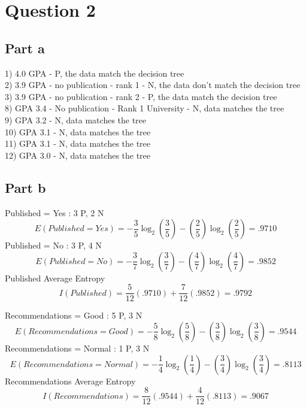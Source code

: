 \documentclass[12pt]{article}
\begin{document}
\section*{Question 2}

\subsection*{Part a}

1) 4.0 GPA - P, the data match the decision tree\\
2) 3.9 GPA - no publication - rank 1 - N, the data don't match the decision tree\\
3) 3.9 GPA - no publication - rank 2 - P, the data match the decision tree\\

8) GPA 3.4 - No publication - Rank 1 University - N, data matches the tree\\
9) GPA 3.2 - N, data matches the tree\\
10) GPA 3.1 - N, data matches the tree\\
11) GPA 3.1 - N, data matches the tree\\
12) GPA 3.0 - N, data matches the tree\\

\subsection*{Part b}

Published = Yes : 3 P, 2 N
\begin{equation}
E(Published = Yes) = -\frac{3}{5}\log_2(\frac{3}{5})-(\frac{2}{5})\log_2(\frac{2}{5}) = .9710
\end{equation}
Published = No : 3 P, 4 N
\begin{equation}
E(Published = No) = -\frac{3}{7}\log_2(\frac{3}{7})-(\frac{4}{7})\log_2(\frac{4}{7}) = .9852
\end{equation}
Published Average Entropy
\begin{equation}
I(Published) = \frac{5}{12}(.9710)+\frac{7}{12}(.9852) = .9792
\end{equation}

Recommendations = Good : 5 P, 3 N
\begin{equation}
E(Recommendations = Good) = -\frac{5}{8}\log_2(\frac{5}{8})-(\frac{3}{8})\log_2(\frac{3}{8}) = .9544
\end{equation}
Recommendations = Normal : 1 P, 3 N
\begin{equation}
E(Recommendations = Normal) = -\frac{1}{4}\log_2(\frac{1}{4})-(\frac{3}{4})\log_2(\frac{3}{4}) = .8113
\end{equation}
Recommendations Average Entropy
\begin{equation}
I(Recommendations) = \frac{8}{12}(.9544)+\frac{4}{12}(.8113) = .9067
\end{equation}
\end{document}
